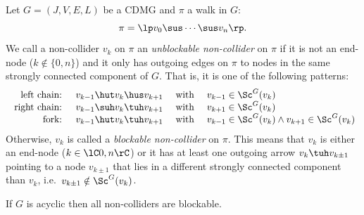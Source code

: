 \begin{Def}\label{def:unblockable_noncollider}
  Let $G=(J,V,E,L)$ be a CDMG and $\pi$ a walk in $G$:
  \[ \pi =\lp  v_0 \sus \cdots \sus v_n \rp.  \]
  We call a non-collider $v_k$ on $\pi$ an \emph{unblockable non-collider} on $\pi$ if it is not an end-node ($k \notin \{0,n\}$) and it only has outgoing edges on $\pi$ to nodes in the same strongly connected component of $G$. That is,
  it is one of the following patterns:
  \[\begin{array}{rccl}
    \text{ left chain: } & v_{k-1} \hut v_k \hus v_{k+1} & \text{ with } & v_{k-1} \in \Sc^G(v_{k})\\
    \text{ right chain: } & v_{k-1} \suh v_k \tuh v_{k+1} & \text{ with } & v_{k+1} \in \Sc^G(v_{k})\\
    \text{ fork: } & v_{k-1} \hut v_k \tuh v_{k+1} & \text{ with } & v_{k-1} \in \Sc^G(v_k) \land v_{k+1} \in \Sc^G(v_k)
  \end{array}\]
  Otherwise, $v_k$ is called a \emph{blockable non-collider} on $\pi$.
  This means that $v_k$ is either an end-node ($k \in \lC 0,n\rC$) or it has at least one outgoing arrow 
  $v_k \tuh v_{k\pm1}$ pointing to a node $v_{k\pm1}$ that lies in a different strongly connected component than $v_k$, i.e.\ $v_{k\pm1} \notin \Sc^G(v_k)$.
\end{Def}
  
\begin{Rem}
If $G$ is acyclic then all non-colliders are blockable.
\end{Rem}


